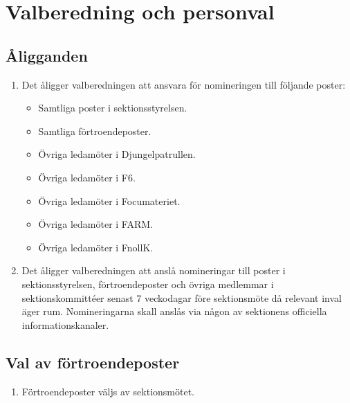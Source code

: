 \documentclass[11pt,a4paper]{article}
\begin{document}
\newpage

\section{Valberedning och personval}

\subsection{Åligganden}

\begin{enumerate}[\thesubsection .1]

  \item Det åligger valberedningen att ansvara för nomineringen till
  följande poster:
    \begin{itemize}
      \item Samtliga poster i sektionsstyrelsen.
      \item Samtliga förtroendeposter.
      \item Övriga ledamöter i Djungelpatrullen.
      \item Övriga ledamöter i F6.
      \item Övriga ledamöter i Focumateriet.
        \item Övriga ledamöter i FARM.
          \item Övriga ledamöter i FnollK. 
        
    \end{itemize}
  \item Det åligger valberedningen att anslå nomineringar till poster i sektionsstyrelsen, förtroendeposter
och övriga medlemmar i sektionskommittéer senast 7 veckodagar före sektionsmöte då relevant inval
äger rum. Nomineringarna skall anslås via någon av sektionens officiella informationskanaler.

\end{enumerate}

\subsection{Val av förtroendeposter}
	\begin{enumerate}[\thesubsection .1]
	\item Förtroendeposter väljs av sektionsmötet.
	\end{enumerate}
\end{document}
